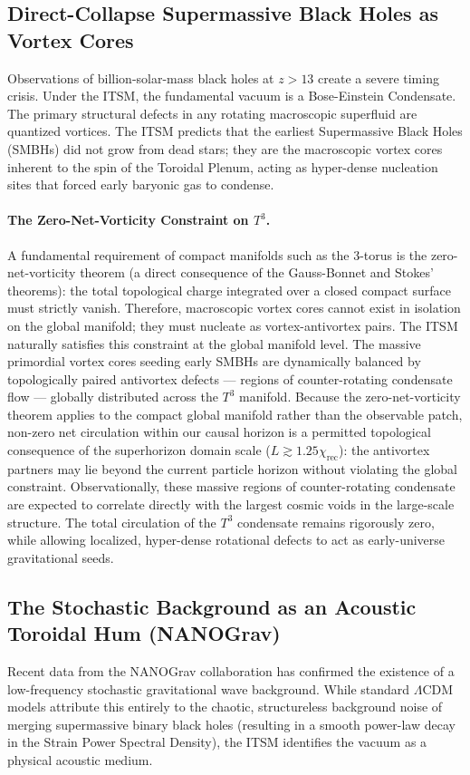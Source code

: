 \documentclass[aps,prd,10pt,twocolumn,superscriptaddress,nofootinbib,floatfix]{revtex4-2}
\begin{document}
\subsection{Direct-Collapse Supermassive Black Holes as Vortex Cores}
Observations of billion-solar-mass black holes at $z>13$ \cite{early_smbh} create a severe timing crisis. Under the ITSM, the fundamental vacuum is a Bose-Einstein Condensate. The primary structural defects in any rotating macroscopic superfluid are quantized vortices. The ITSM predicts that the earliest Supermassive Black Holes (SMBHs) did not grow from dead stars; they are the macroscopic vortex cores inherent to the spin of the Toroidal Plenum, acting as hyper-dense nucleation sites that forced early baryonic gas to condense.

\paragraph{The Zero-Net-Vorticity Constraint on $T^3$.} A fundamental requirement of compact manifolds such as the 3-torus is the zero-net-vorticity theorem (a direct consequence of the Gauss-Bonnet and Stokes' theorems): the total topological charge integrated over a closed compact surface must strictly vanish. Therefore, macroscopic vortex cores cannot exist in isolation on the global manifold; they must nucleate as vortex-antivortex pairs. The ITSM naturally satisfies this constraint at the global manifold level. The massive primordial vortex cores seeding early SMBHs are dynamically balanced by topologically paired antivortex defects --- regions of counter-rotating condensate flow --- globally distributed across the $T^3$ manifold. Because the zero-net-vorticity theorem applies to the compact global manifold rather than the observable patch, non-zero net circulation within our causal horizon is a permitted topological consequence of the superhorizon domain scale ($L \gtrsim 1.25 \chi_{\text{rec}}$): the antivortex partners may lie beyond the current particle horizon without violating the global constraint. Observationally, these massive regions of counter-rotating condensate are expected to correlate directly with the largest cosmic voids in the large-scale structure. The total circulation of the $T^3$ condensate remains rigorously zero, while allowing localized, hyper-dense rotational defects to act as early-universe gravitational seeds.

\subsection{The Stochastic Background as an Acoustic Toroidal Hum (NANOGrav)}
Recent data from the NANOGrav collaboration \cite{nanograv} has confirmed the existence of a low-frequency stochastic gravitational wave background. While standard $\Lambda$CDM models attribute this entirely to the chaotic, structureless background noise of merging supermassive binary black holes (resulting in a smooth power-law decay in the Strain Power Spectral Density), the ITSM identifies the vacuum as a physical acoustic medium. 
\end{document}
